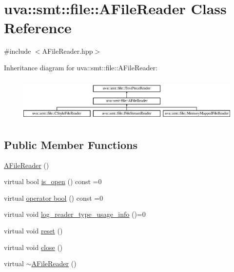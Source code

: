 \hypertarget{classuva_1_1smt_1_1file_1_1_a_file_reader}{}\section{uva\+:\+:smt\+:\+:file\+:\+:A\+File\+Reader Class Reference}
\label{classuva_1_1smt_1_1file_1_1_a_file_reader}


{\ttfamily \#include $<$A\+File\+Reader.\+hpp$>$}

Inheritance diagram for uva\+:\+:smt\+:\+:file\+:\+:A\+File\+Reader\+:\begin{figure}[H]
\begin{center}
\leavevmode
\includegraphics[height=2.258065cm]{classuva_1_1smt_1_1file_1_1_a_file_reader}
\end{center}
\end{figure}
\subsection*{Public Member Functions}
\begin{DoxyCompactItemize}
\item 
\hyperlink{classuva_1_1smt_1_1file_1_1_a_file_reader_a3bbe806186d34507f94f54e3009e4203}{A\+File\+Reader} ()
\item 
virtual bool \hyperlink{classuva_1_1smt_1_1file_1_1_a_file_reader_a13e1dea763c1ca16997668d48c885b9f}{is\+\_\+open} () const  =0
\item 
virtual \hyperlink{classuva_1_1smt_1_1file_1_1_a_file_reader_a689d18c81e821000322f5e3c3acff838}{operator bool} () const  =0
\item 
virtual void \hyperlink{classuva_1_1smt_1_1file_1_1_a_file_reader_a4bebfdd38dbada5b5d770b072eaed816}{log\+\_\+reader\+\_\+type\+\_\+usage\+\_\+info} ()=0
\item 
virtual void \hyperlink{classuva_1_1smt_1_1file_1_1_a_file_reader_ac712ac908a31b7fef5c0f093926e4dc1}{reset} ()
\item 
virtual void \hyperlink{classuva_1_1smt_1_1file_1_1_a_file_reader_ad0831f43ae10b055ea3342e23ab0e611}{close} ()
\item 
virtual \hyperlink{classuva_1_1smt_1_1file_1_1_a_file_reader_a3fe4ec8e90c2c677af88d575e6cdc94e}{$\sim$\+A\+File\+Reader} ()
\end{DoxyCompactItemize}


